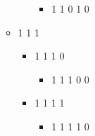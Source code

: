 \begin{itemize}
\begin{itemize}
\begin{itemize}
\begin{itemize}
\item 1 1 0 1 0
\end{itemize}
\end{itemize}
\item 1 1 1 


\begin{itemize}
\item 1 1 1 0 


\begin{itemize}
\item 1 1 1 0 0
\end{itemize}
\item 1 1 1 1 


\begin{itemize}
\item 1 1 1 1 0
\end{itemize}
\end{itemize}
\end{itemize}
\end{itemize}

